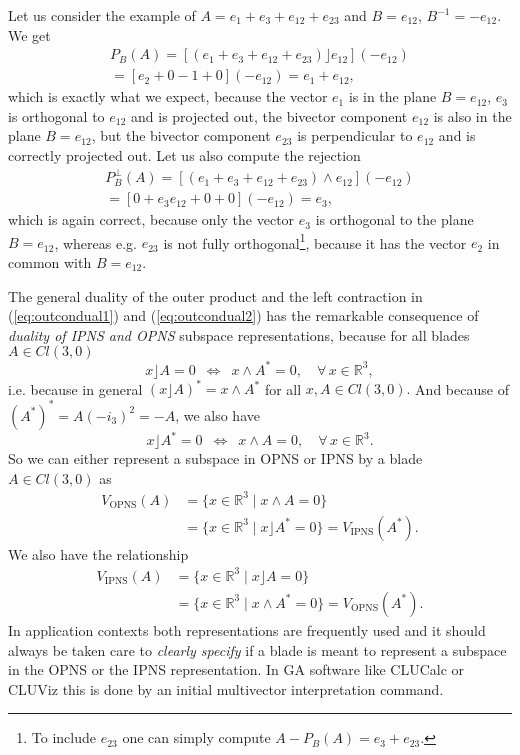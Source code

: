 \documentclass[cameraready]{jcmsi}%
\newcommand{\R}{\mathbb{R}}
\newcommand{\be}{\begin{equation}}
\newcommand{\ee}{\end{equation}}
\begin{document}
Let us consider the example of $A = e_1+e_3 + e_{12}+e_{23}$ and $B=e_{12}$, $B^{-1}=-e_{12}$. We get 
\begin{gather}
  P_B(A) = [(e_1+e_3 + e_{12}+e_{23})\rfloor e_{12}](-e_{12})
  \nonumber \\
  = [e_2 + 0 -1 +0](-e_{12}) = e_1 + e_{12},
\end{gather}
which is exactly what we expect, because the vector $e_1$ is in the plane $B=e_{12}$, $e_3$ is orthogonal to $e_{12}$ and is projected out, the bivector component $e_{12}$ is also in the plane $B=e_{12}$, but the bivector component $e_{23}$ is perpendicular to $e_{12}$ and is correctly projected out. Let us also compute the rejection
\begin{gather}
  P^{\perp}_B(A) = [(e_1+e_3 + e_{12}+e_{23})\wedge e_{12}](-e_{12})
  \nonumber \\
  = [0+e_3e_{12}+0+0](-e_{12}) = e_3,
\end{gather}
which is again correct, because only the vector $e_3$ is orthogonal to the plane $B=e_{12}$, whereas e.g. $e_{23}$ is not fully orthogonal\footnote{To include  $e_{23}$ one can simply compute $A-P_B(A) = e_3+e_{23}$.}, because it has the vector $e_2$ in common with $B=e_{12}$.

The general duality of the outer product and the left contraction in (\ref{eq:outcondual1}) and (\ref{eq:outcondual2}) has the remarkable consequence of \textit{duality of IPNS and OPNS} subspace representations, because for all blades $A\in Cl(3,0)$
\be 
  x \rfloor A = 0
  \,\,\, \Leftrightarrow \,\,\,
  x \wedge A^* = 0, \quad \forall \, x\in \R^3,
\ee 
i.e. because in general $(x \rfloor A)^*=x \wedge A^*$ for all $x,A\in Cl(3,0).$ And because of $(A^*)^* = A (-i_3)^2 = - A$, we also have 
\be 
  x \rfloor A^* = 0
  \,\,\, \Leftrightarrow \,\,\,
  x \wedge A = 0, \quad \forall \, x\in \R^3.
\ee 
So we can either represent a subspace in OPNS or IPNS by a blade $A \in Cl(3,0)$ as
\begin{align} 
  V_{\text{OPNS}}(A) 
  &= \{x \in \R^3 \mid x \wedge A = 0\}
  \\
  &= \{x \in \R^3 \mid x \rfloor A^* = 0\}
  = V_{\text{IPNS}}(A^*).
  \nonumber 
\end{align}
We also have the relationship
\begin{align}  
  V_{\text{IPNS}}(A) 
  &= \{x \in \R^3 \mid x \rfloor A = 0\}
  \\
  &= \{x \in \R^3 \mid x \wedge A^* = 0\}
  = V_{\text{OPNS}}(A^*).
  \nonumber 
\end{align}
In application contexts both representations are frequently used and it should always be taken care to \textit{clearly specify} if a blade is meant to represent a subspace in the OPNS or the IPNS representation. In GA software like CLUCalc or CLUViz \cite{CP:CLUCalc} this is done by an initial multivector interpretation command. 
\end{document}
